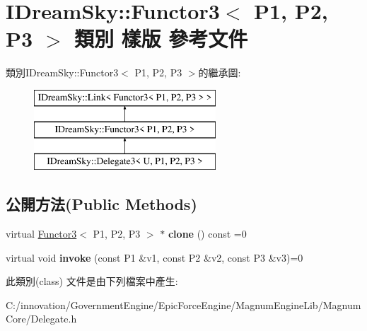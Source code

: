 \hypertarget{class_i_dream_sky_1_1_functor3}{}\section{I\+Dream\+Sky\+:\+:Functor3$<$ P1, P2, P3 $>$ 類別 樣版 參考文件}
\label{class_i_dream_sky_1_1_functor3}
類別\+I\+Dream\+Sky\+:\+:Functor3$<$ P1, P2, P3 $>$的繼承圖\+:\begin{figure}[H]
\begin{center}
\leavevmode
\includegraphics[height=3.000000cm]{class_i_dream_sky_1_1_functor3}
\end{center}
\end{figure}
\subsection*{公開方法(Public Methods)}
\begin{DoxyCompactItemize}
\item 
virtual \hyperlink{class_i_dream_sky_1_1_functor3}{Functor3}$<$ P1, P2, P3 $>$ $\ast$ {\bfseries clone} () const  =0\hypertarget{class_i_dream_sky_1_1_functor3_a71e7ff1056d05f3a396ba4ee36a6d7a4}{}\label{class_i_dream_sky_1_1_functor3_a71e7ff1056d05f3a396ba4ee36a6d7a4}

\item 
virtual void {\bfseries invoke} (const P1 \&v1, const P2 \&v2, const P3 \&v3)=0\hypertarget{class_i_dream_sky_1_1_functor3_a296c19d9c9e4b1986d37c3d727b00256}{}\label{class_i_dream_sky_1_1_functor3_a296c19d9c9e4b1986d37c3d727b00256}

\end{DoxyCompactItemize}


此類別(class) 文件是由下列檔案中產生\+:\begin{DoxyCompactItemize}
\item 
C\+:/innovation/\+Government\+Engine/\+Epic\+Force\+Engine/\+Magnum\+Engine\+Lib/\+Magnum\+Core/Delegate.\+h\end{DoxyCompactItemize}
